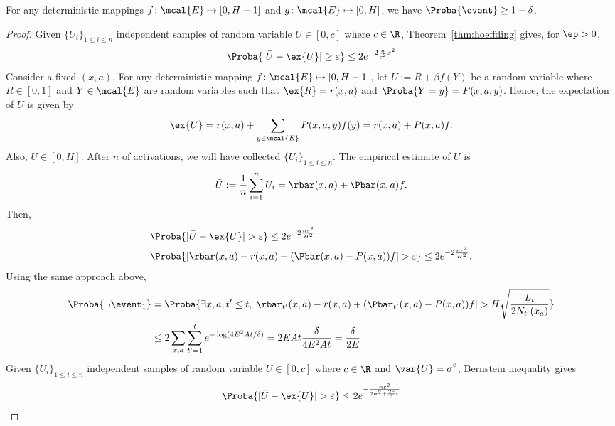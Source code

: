         \begin{lem}
        \label{lem:high_prob}
            For any deterministic mappings $f\colon \mcal{E}\mapsto[0,H-1]$ and $g\colon \mcal{E}\mapsto[0,H]$, we have $\Proba{\event}\ge1-\delta$.
        \end{lem}
        \begin{proof}
        Given $\{U_i\}_{1\le i\le n}$ independent samples of random variable $U\in[0, c]$ where $c\in\R$, Theorem~\ref{thm:hoeffding} gives, for $\ep>0$,
        \begin{align*}
        \Proba{|\bar{U}-\ex{U}|\ge \varepsilon} \le 2e^{-2\frac{n}{c^2}\varepsilon^2}
        \end{align*}
        Consider a fixed $(x,a)$.
        For any deterministic mapping $f\colon\mcal{E}\mapsto[0,H-1]$, let $U:=R+\beta f(Y)$ be a random variable where $R\in[0,1]$ and $Y\in\mcal{E}$ are random variables such that $\ex{R}=r(x,a)$ and $\Proba{Y=y}=P(x,a,y)$.
        Hence, the expectation of $U$ is given by 
        \begin{align*}
        \ex{U}=r(x,a) +\sum_{y\in\mcal{E}}P(x,a,y)f(y)=r(x,a) +P(x,a)f.
        \end{align*}
        Also, $U\in [0,H]$.
        After $n$ of activations, we will have collected $\{U_i\}_{1\le i\le n}$.
        The empirical estimate of $U$ is
        $$\bar{U}:=\frac1n\sum_{i=1}^{n} U_i=\rbar(x,a) +\Pbar(x,a)f.$$
        Then,
        \begin{align*}
        &\Proba{\vert\bar{U}-\ex{U}\vert >\varepsilon} \le2e^{-2\frac{n\varepsilon^2}{H^2}} \\
        &\Proba{\vert \rbar(x,a)-r(x,a) +(\Pbar(x,a) -P(x,a))f\vert >\varepsilon} \le2e^{-2\frac{n\varepsilon^2}{H^2}}.
        \end{align*}
        Using the same approach above,
        \begin{align*}
        \Proba{\neg\event_1} 
        &=\Proba{\exists x,a, t'\le t,|\rbar_{t'}(x,a)-r(x,a)+(\Pbar_{t'}(x,a)-P(x,a))f| >H\sqrt{\frac{L_t}{2N_{t'}(x_a)}}} \\
        &\le2\sum_{x,a} \sum_{t'=1}^{t}e^{-\log(4E^2At/\delta)} =2EAt\frac{\delta}{4E^2At}=\frac{\delta}{2E}
        \end{align*}
        Given $\{U_i\}_{1\le i\le n}$ independent samples of random variable $U\in[0, c]$ where $c\in\R$ and $\var{U}=\sigma^2$, Bernstein inequality gives
        \begin{align*}
        \Proba{|\bar{U}-\ex{U}|> \varepsilon} \le 2e^{-\frac{n\varepsilon^2}{2\sigma^2+\frac{2c}3\varepsilon}}

\end{align*}
\end{proof}
